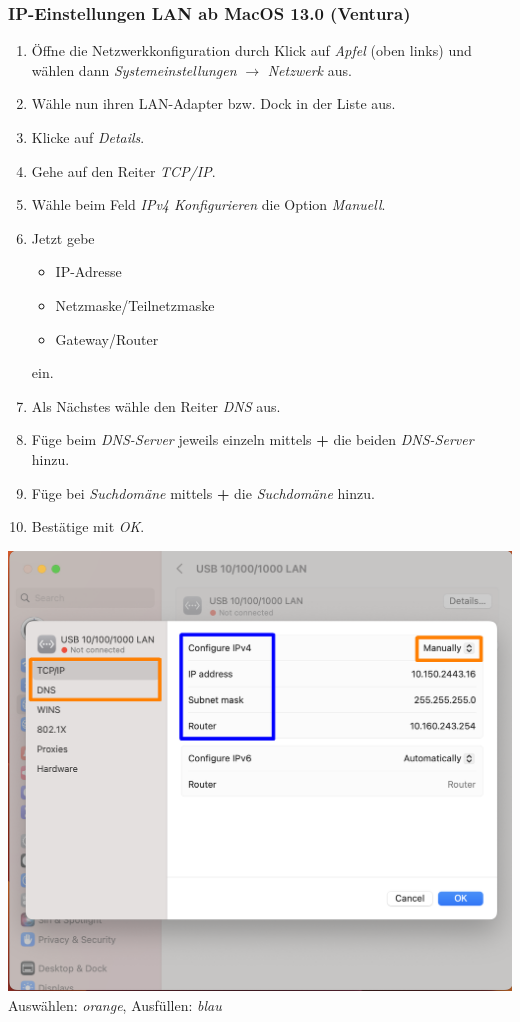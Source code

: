 \documentclass[a4paper,12pt]{scrartcl}
\begin{document}
\subsubsection*{IP-Einstellungen LAN ab MacOS 13.0 (Ventura)}

\begin{minipage}{0.57\textwidth}
	\begin{enumerate}
		\item Öffne die Netzwerkkonfiguration durch Klick auf \textit{Apfel} (oben links) und wählen dann \textit{Systemeinstellungen} $\rightarrow$ \textit{Netzwerk} aus.
		\item Wähle nun ihren LAN-Adapter bzw. Dock in der Liste aus.
		\item Klicke auf \textit{Details}.
		\item Gehe auf den Reiter \textit{TCP/IP}.
		\item Wähle beim Feld \textit{IPv4 Konfigurieren} die Option \textit{Manuell}.
		\item Jetzt gebe
		\begin{itemize}
			\item IP-Adresse
			\item Netzmaske/Teilnetzmaske
			\item Gateway/Router
		\end{itemize}
		ein.
		\item Als Nächstes wähle den Reiter \textit{DNS} aus.
		\item Füge beim \textit{DNS-Server} jeweils einzeln mittels \textbf{+} die beiden \textit{DNS-Server} hinzu.
		\item Füge bei \textit{Suchdomäne} mittels \textbf{+} die \textit{Suchdomäne} hinzu.
		\item Bestätige mit \textit{OK}.
	\end{enumerate}
\end{minipage}
\hfill
\begin{minipage}{0.4\textwidth}
	\centering
	\includegraphics[width=\linewidth,keepaspectratio]{Bilder/macos/ip_macos13}
	Auswählen: \textit{orange}, Ausfüllen: \textit{blau}
\end{minipage}
\end{document}
